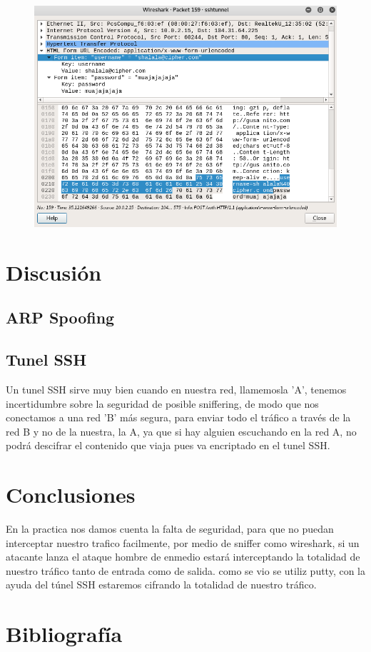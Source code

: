 \documentclass{article}
\begin{document}
\begin{figure}[H]
\centering
\includegraphics[width=1\textwidth]{17-CONTRASENAENCLARO}
\end{figure}

\section{Discusi\'on}

\subsection{ARP Spoofing}

\subsection{Tunel SSH}

Un tunel SSH sirve muy bien cuando en nuestra red, llamemosla 'A', tenemos incertidumbre sobre la seguridad de posible sniffering, de modo que nos conectamos a una red 'B' m\'as segura, para enviar todo el tr\'afico a trav\'es de la red B y no de la nuestra, la A, ya que si hay alguien escuchando en la red A, no podr\'a descifrar el contenido que viaja pues va encriptado en el tunel SSH.

\section{Conclusiones}
En la practica nos damos cuenta la falta de seguridad, para que no puedan interceptar nuestro trafico facilmente, por medio de sniffer como wireshark, 
si un atacante lanza el ataque hombre de enmedio estará interceptando la totalidad de nuestro tráfico tanto de entrada como de salida. como se vio se utiliz putty, con la ayuda del túnel SSH estaremos cifrando la totalidad de nuestro tráfico.

\section{Bibliograf\'ia}
\end{document}

